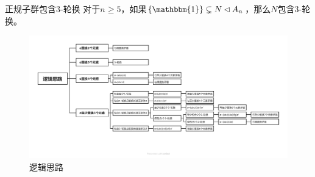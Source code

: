 \begin{lemma}{}{正规子群包含3-轮换}
	对于$n\ge 5$，如果$\{\mathbbm{1}\}\subsetneq N\lhd A_n$，那么$N$包含$3$-轮换。
\end{lemma}

\begin{figure}[H]
	\centering
	\includegraphics[scale = 0.4]{../figure/An为单群}
	\caption{逻辑思路}
\end{figure}

